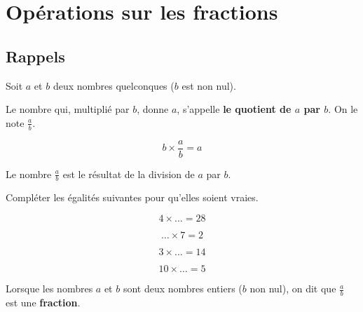 \documentclass[a4paper]{book}
\begin{document}
\setcounter{chapter}{7}
\renewcommand{\monTitre}{Opérations sur les fractions}
\chapter{\monTitre}
\thispagestyle{fancy} 


\section{Rappels}

    \begin{definition} 
        Soit \( a \) et \( b \) deux nombres quelconques (\( b \) est non nul). 
        
        Le nombre qui, multiplié par \( b \), donne \( a \), s'appelle \textbf{le quotient de \( a \) par \( b \)}.         
        On le note \( \frac{a}{b} \).

        \[  b \times \boxed{\frac{a}{b}} = a \] 
    \end{definition}
    

    \begin{remarque}
        Le nombre $\frac{a}{b}$ est le résultat de la division de \( a \) par \( b \).
    \end{remarque}
    
     
    \begin{exemple} 
        Compléter les égalités suivantes pour qu'elles soient vraies.
        
        \smallskip

        \begin{minipage}{0.24\linewidth}
            \[4\times \ldots = 28\]
        \end{minipage}
        \hfill\vline\hfill
        \begin{minipage}{0.24\linewidth}
            \[\ldots \times 7 = 2\]

        \end{minipage}
        \hfill\vline\hfill
        \begin{minipage}{0.24\linewidth}
            \[3\times \ldots = 14\]
        \end{minipage}
        \hfill\vline\hfill
        \begin{minipage}{0.24\linewidth}
            \[10\times \ldots = 5\]
        \end{minipage}
    \end{exemple}
    
    
    \begin{definition}
        Lorsque les nombres \( a \) et \( b \) sont deux nombres entiers  ($b$ non nul), on dit que \( \frac{a}{b} \) est une \textbf{fraction}.
    \end{definition}
    
\end{document}
